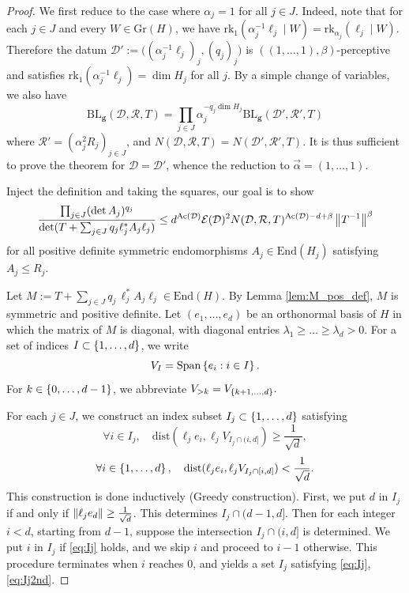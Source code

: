 \begin{proof}
We first reduce to the case where $\alpha_j = 1$ for all $j \in J$. Indeed, note that for each $j \in J$ and every $W \in \mathrm{Gr}(H)$, we have
$\mathrm{rk}_1( \alpha_j^{-1} \ell_j \mid W) = \mathrm{rk}_{\alpha_j}(\ell_j \mid W)$.
Therefore the datum $\mathcal{D}':=\bigl((\alpha_j^{-1} \ell_j)_j, (q_j)_j\bigr)$ is $((1,\dotsc,1), \beta)$-perceptive and satisfies $\mathrm{rk}_1( \alpha_j^{-1} \ell_j)=\dim H_{j}$ for all $j$.
By a simple change of variables, we also have
$$\mathrm{BL}_{\mathbf{g}}(\mathcal{D}, \mathcal{R}, T)=\prod_{j\in J} \alpha_{j}^{-q_{j}\dim H_{j}} \mathrm{BL}_{\mathbf{g}}(\mathcal{D}', \mathcal{R}', T)$$
 where $\mathcal{R}'=(\alpha_{j}^2 R_{j})_{j\in J}$, and $N(\mathcal{D}, \mathcal{R}, T)=N(\mathcal{D}', \mathcal{R}', T)$.
It is thus sufficient to prove the theorem for $\mathcal{D}=\mathcal{D}'$, whence the reduction to $\vec{\alpha}=(1,\dotsc,1)$.

Inject the definition and taking the squares, our goal is to show
\begin{equation}
\label{eq:rlub1}
\frac{\prod_{j\in J} (\det A_{j})^{q_{j}} }{\det(T + \sum_{j \in J} q_j \ell_j^* A_{j}\ell_j)}\leq d^{\mathrm{Ac}(\mathcal{D})}  \mathcal{E}(\mathcal{D})^2 N(\mathcal{D}, \mathcal{R}, T)^{\mathrm{Ac}(\mathcal{D})-d+\beta} \left\lVert T^{-1} \right\rVert^{\beta}
\end{equation}
for all positive definite symmetric endomorphisms $A_j \in \mathrm{End}(H_j)$ satisfying $A_j \leq R_j$.

Let $M := T+ \sum_{j\in J} q_{j} \,\ell^*_{j} A_{j}\ell_{j} \in \mathrm{End}(H)$.
By Lemma \ref{lem:M_pos_def}, $M$ is symmetric and positive definite.
Let $(e_1, \dotsc, e_d)$ be an orthonormal basis of $H$ in which the matrix of $M$ is diagonal, with diagonal entries $\lambda_{1}\geq \dots \geq \lambda_{d}>0$.
For a set of indices $I \subset \left\{ 1, \dotsc, d \right\}$, we write
\[
V_I = \mathrm{Span} \left\{  e_i : i \in I \right\}.
\]
For $k \in \left\{ 0,\dotsc, d-1 \right\}$, we abbreviate
\(
V_{> k} = V_{\left\{ k+1, \dotsc, d \right\}}.
\)

For each $j \in J$, we construct an index subset $I_j \subset \left\{ 1, \dotsc, d \right\}$ satisfying
\begin{equation}
\label{eq:Ij}
\forall i \in I_{j}, \quad \mathrm{dist}(\ell_j e_i, \ell_j V_{I_j \cap (i,d] }) \geq \frac{1}{\sqrt{d}},
\end{equation}
\begin{equation}\label{eq:Ij2nd}
\forall i \in \left\{ 1, \dotsc, d \right\},\quad \mathrm{dist}(\ell_j e_i, \ell_j V_{I_j \cap [i,d]}) < \frac{1}{\sqrt{d}}.
\end{equation}
This construction is done inductively (Greedy construction).
First, we put $d$ in $I_j$ if and only if $\left\lVert \ell_j e_d \right\rVert \geq \frac{1}{\sqrt{d}}$.
This determines $I_j \cap (d-1,d]$.
Then for each integer $i < d$, starting from $d - 1$, suppose the intersection $I_j \cap (i, d]$ is determined.
We put $i$ in $I_j$ if \eqref{eq:Ij} holds, and we skip $i$ and proceed to $i - 1$ otherwise.
This procedure terminates when $i$ reaches $0$, and yields a set $I_{j}$ satisfying \eqref{eq:Ij}, \eqref{eq:Ij2nd}.



\end{proof}
